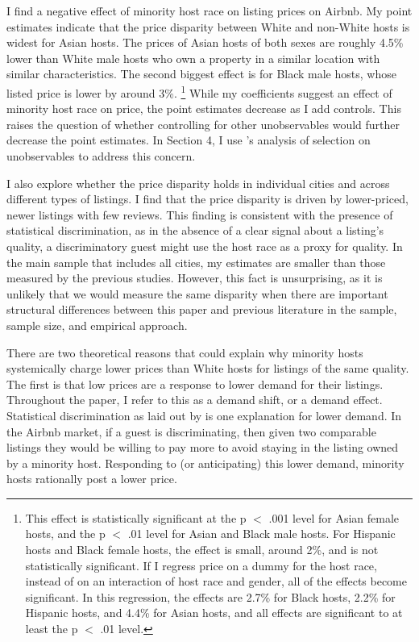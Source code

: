 I find a negative effect of minority host race on listing prices on Airbnb. My point estimates indicate that the price disparity between White and non-White hosts is widest for Asian hosts. The prices of Asian hosts of both sexes are roughly 4.5\% lower than White male hosts who own a property in a similar location with similar characteristics. The second biggest effect is for Black male hosts, whose listed price is lower by around 3\%.%
	\footnote{This effect is statistically significant at the p $<$ .001 level for Asian female hosts, and the p $<$ .01 level for Asian and Black male hosts. For Hispanic hosts and Black female hosts, the effect is small, around 2\%, and is not statistically significant. If I regress price on a dummy for the host race, instead of on an interaction of host race and gender, all of the effects become significant. In this regression, the effects are 2.7\% for Black hosts, 2.2\% for Hispanic hosts, and 4.4\% for Asian hosts, and all effects are significant to at least the p $<$ .01 level.} 
While my coefficients suggest an effect of minority host race on price, the point estimates decrease as I add controls. This raises the question of whether controlling for other unobservables would further decrease the point estimates. In Section 4, I use \cite{oster}'s analysis of selection on unobservables to address this concern. 

I also explore whether the price disparity holds in individual cities and across different types of listings. I find that the price disparity is driven by lower-priced, newer listings with few reviews. This finding is consistent with the presence of statistical discrimination, as in the absence of a clear signal about a listing's quality, a discriminatory guest might use the host race as a proxy for quality. In the main sample that includes all cities, my estimates are smaller than those measured by the previous studies. However, this fact is unsurprising, as it is unlikely that we would measure the same disparity when there are important structural differences between this paper and previous literature in the sample, sample size, and empirical approach. 

There are two theoretical reasons that could explain why minority hosts systemically charge lower prices than White hosts for listings of the same quality. The first is that low prices are a response to lower demand for their listings. Throughout the paper, I refer to this as a demand shift, or a demand effect. Statistical discrimination as laid out by \cite{becker} is one explanation for lower demand. In the Airbnb market, if a guest is discriminating, then given two comparable listings they would be willing to pay more to avoid staying in the listing owned by a minority host. Responding to (or anticipating) this lower demand, minority hosts rationally post a lower price. 

